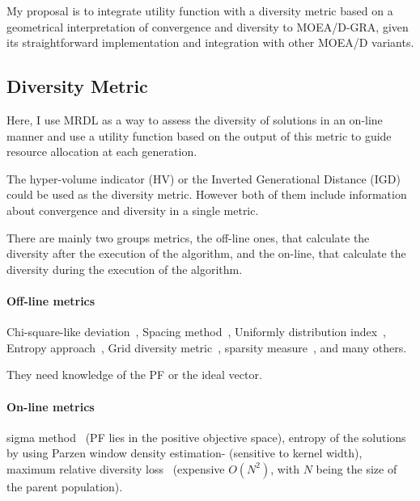\documentclass{IEEEtran}
\begin{document}
My proposal is to integrate utility function with a diversity metric based on a geometrical interpretation of convergence and diversity to MOEA/D-GRA, given its straightforward implementation and integration with other MOEA/D variants.

%

\subsection{Diversity Metric}

Here, I use MRDL as a way to assess the diversity of solutions in an on-line manner and use a utility function based on the output of this metric to guide resource allocation at each generation. 

The hyper-volume indicator (HV) or the Inverted Generational Distance (IGD)  could be used as the diversity metric. However both of them include information about convergence and diversity in a single metric.

There are mainly two groups metrics, the off-line ones, that calculate the diversity after the execution of the algorithm, and the on-line, that calculate the diversity during the execution of the algorithm. 

\paragraph{Off-line metrics} Chi-square-like deviation~\cite{deb1989genetic}, Spacing method~\cite{scott1995fault}, Uniformly distribution index~\cite{tan2002evolutionary}, Entropy approach~\cite{farhang2002diversity}, Grid diversity metric~\cite{deb2002running}, sparsity measure~\cite{deb2003fast}, and many others. 

They need knowledge of the PF or the ideal vector.

\paragraph{On-line metrics}sigma method~\cite{mostaghim2003strategies}  (PF lies in the positive objective space), 
entropy of the solutions by using Parzen window density estimation-\cite{tan2008evolutionary} (sensitive to kernel width), maximum relative diversity loss~\cite{gee2015online} (expensive $O(N^2)$, with $N$ being the size of the parent population).
\end{document}
